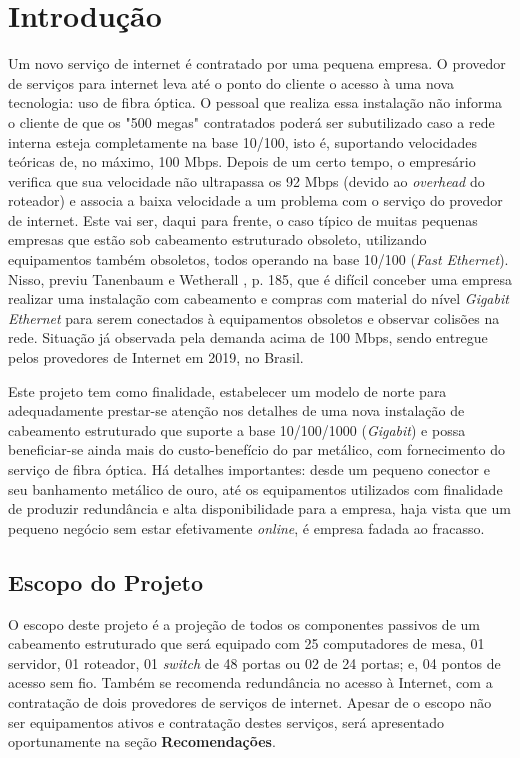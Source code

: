 \documentclass[	DIV=calc,%
							paper=a4,%
							fontsize=12pt,%
							onecolumn]{scrartcl}	 					%
\begin{document}
\clearpage
\renewcommand{\contentsname}{Sumário}
\tableofcontents
\clearpage

\section{Introdução}

Um novo serviço de internet é contratado por uma pequena empresa. O provedor de serviços para internet leva até o ponto do cliente o acesso à uma nova tecnologia: uso de fibra óptica. O pessoal que realiza essa instalação não informa o cliente de que os "500 megas" contratados poderá ser subutilizado caso a rede interna esteja completamente na base 10/100, isto é, suportando velocidades teóricas de, no máximo, 100 Mbps. Depois de um certo tempo, o empresário verifica que sua velocidade não ultrapassa os 92 Mbps (devido ao \textit{overhead} do roteador) e associa a baixa velocidade a um problema com o serviço do provedor de internet. Este vai ser, daqui para frente, o caso típico de muitas pequenas empresas que estão sob cabeamento estruturado obsoleto, utilizando equipamentos também obsoletos, todos operando na base 10/100 (\textit{Fast Ethernet}). Nisso, previu Tanenbaum e Wetherall \cite{t2013}, p. 185, que é difícil conceber uma empresa realizar uma instalação com cabeamento e compras com material do nível \textit{Gigabit Ethernet} para serem conectados à equipamentos obsoletos e observar colisões na rede. Situação já observada pela demanda acima de 100 Mbps, sendo entregue pelos provedores de Internet em 2019, no Brasil.

\bigskip

Este projeto tem como finalidade, estabelecer um modelo de norte para adequadamente prestar-se atenção nos detalhes de uma nova instalação de cabeamento estruturado que suporte a base 10/100/1000 (\textit{Gigabit}) e possa beneficiar-se ainda mais do custo-benefício do par metálico, com fornecimento do serviço de fibra óptica. Há detalhes importantes: desde um pequeno conector e seu banhamento metálico de ouro, até os equipamentos utilizados com finalidade de produzir redundância e alta disponibilidade para a empresa, haja vista que um pequeno negócio sem estar efetivamente \textit{online}, é empresa fadada ao fracasso.
\bigskip

\subsection{Escopo do Projeto}
O escopo deste projeto é a projeção de todos os componentes passivos de um cabeamento estruturado que será equipado com 25 computadores de mesa, 01 servidor, 01 roteador, 01 \textit{switch} de 48 portas ou 02 de 24 portas; e, 04 pontos de acesso sem fio. Também se recomenda redundância no acesso à Internet, com a contratação de dois provedores de serviços de internet. Apesar de o escopo não ser equipamentos ativos e contratação destes serviços, será apresentado oportunamente na seção \textbf{Recomendações}.
\end{document}
